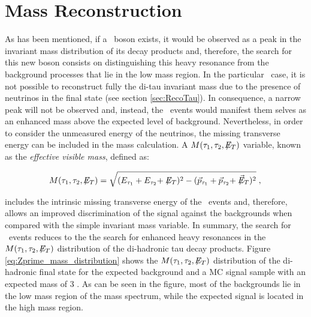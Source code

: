 \section{Mass Reconstruction}
\label{sec:Mass Reconstruction}

As has been mentioned, if a \Zprime~boson exists, it would be observed
as a peak in the invariant mass distribution of its decay products 
and, therefore, the search for this new boson consists on distinguishing this
heavy resonance from the background processes that lie in the low mass region. In the particular 
\Zprimetotautau~case, it is not possible to reconstruct fully the di-tau invariant mass
due to the presence of neutrinos in the final state (see section \ref{sec:RecoTau}). In consequence,
a narrow peak will not be observed and, instead, the \Zprime~events would manifest them selves
as an enhanced mass above the expected level of background. Nevertheless, in order to 
consider the unmeasured energy of the neutrinos, the missing transverse energy can be 
included in the mass calculation. A $M(\tau_1,\tau_2,\not\!\!E_T)$ variable, known as the \textit{effective visible mass},
defined as:

\begin{equation} \label{eq:eff_mass}
M(\tau_1,\tau_2,\not\!\!E_T)  = \sqrt{(E_{\tau_1} + E_{\tau_2} + \not\!\!E_T)^2 - (\vec{p}_{\tau_1} + \vec{p}_{\tau_2} + \not\!\!\vec{E}_T)^2} \;, \\
\end{equation}

\noindent includes the intrinsic missing transverse energy of the \Zprimetotautau~events and, therefore,
allows an improved discrimination of the signal against the backgrounds when compared with 
the simple invariant mass variable. In summary, the search for \Zprimetotauh~events 
reduces to the the search for enhanced heavy resonances in the $M(\tau_1,\tau_2,\not\!\!E_T)$ distribution 
of the di-hadronic tau decay products. Figure \ref{eq:Zprime_mass_distribution}
shows the $M(\tau_1,\tau_2,\not\!\!E_T)$ distribution of the di-hadronic final state
for the expected background and a MC signal sample with an expected mass of 3 \TeV. As can be 
seen in the figure, most of the backgrounds lie in the low mass region of the mass spectrum, while the 
expected signal is located in the high mass region.


